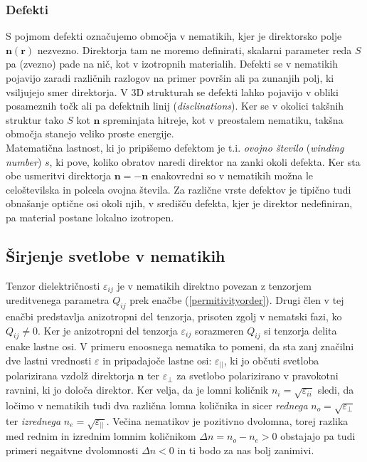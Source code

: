 \documentclass[longbibliography,slovene,a4paper,12pt]{book}
\begin{document}
\subsubsection{Defekti}

S pojmom defekti označujemo območja v nematikih, kjer je direktorsko polje $\mathbf{n}(\mathbf{r})$ nezvezno. Direktorja tam ne moremo definirati, skalarni parameter reda $S$ pa (zvezno) pade na nič, kot v izotropnih materialih. Defekti se v nematikih pojavijo zaradi različnih razlogov na primer površin ali pa zunanjih polj, ki vsiljujejo smer direktorja. V 3D strukturah se defekti lahko pojavijo v obliki posameznih točk ali pa defektnih linij (\emph{disclinations}). Ker se v okolici takšnih struktur tako $S$ kot $\mathbf{n}$ spreminjata hitreje, kot v preostalem nematiku, takšna območja stanejo veliko proste energije\cite{lavrenovitch}. \\

Matematična lastnost, ki jo pripišemo defektom je t.i. \emph{ovojno število} (\emph{winding number}) $s$, ki pove, koliko obratov naredi direktor na zanki okoli defekta. Ker sta obe usmeritvi direktorja $\mathbf{n} = -\mathbf{n}$  enakovredni so v nematikih možna le celoštevilska in polcela ovojna števila\cite{lavrenovitch}. Za različne vrste defektov je tipično tudi obnašanje optične osi okoli njih, v središču defekta, kjer je direktor nedefiniran, pa material postane lokalno izotropen.

\subsection{Širjenje svetlobe v nematikih} 

Tenzor dielektričnosti $\varepsilon_{ij}$ je v nematikih direktno povezan z tenzorjem ureditvenega parametra $Q_{ij}$ prek enačbe (\ref{permitivityorder}). Drugi člen v tej enačbi predstavlja anizotropni del tenzorja, prisoten zgolj v nematski fazi, ko $Q_{ij} \neq 0$. Ker je anizotropni del tenzorja $\varepsilon_{ij}$ sorazmeren $Q_{ij}$ si tenzorja delita enake lastne osi. V primeru enoosnega nematika to pomeni, da sta zanj značilni dve lastni vrednosti $\varepsilon$ in pripadajoče lastne osi: $\varepsilon_{||}$, ki jo občuti svetloba polarizirana vzdolž direktorja $\mathbf{n}$ ter $\varepsilon_{\perp}$ za svetlobo polarizirano v pravokotni ravnini, ki jo določa direktor. 
Ker velja, da je lomni količnik $n_i = \sqrt{\varepsilon_{ii}}$ sledi, da ločimo v nematikih tudi dva različna lomna količnika in sicer \emph{rednega} $n_o = \sqrt{\varepsilon_{\perp}}$ ter \emph{izrednega} $n_e = \sqrt{\varepsilon_{||}}$. Večina nematikov je pozitivno dvolomna, torej razlika med rednim in izrednim lomnim količnikom $\Delta n = n_o - n_e > 0$ obstajajo pa tudi primeri negaitvne dvolomnosti $\Delta n < 0$ in ti bodo za nas bolj zanimivi.\\
\end{document}
